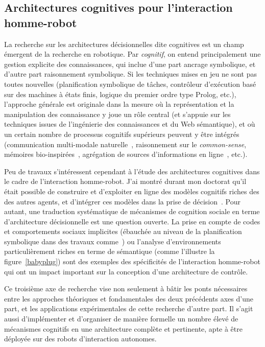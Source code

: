\documentclass[a4paper]{article}
\begin{document}
\subsection{Architectures cognitives pour l'interaction homme-robot}

La recherche sur les architectures décisionnelles dite cognitives est un champ
émergent de la recherche en robotique. Par \emph{cognitif}, on entend
principalement une gestion explicite des connaissances, qui inclue d'une part
ancrage symbolique, et d'autre part raisonnement symbolique. Si les techniques
mises en jeu ne sont pas toutes nouvelles (planification symbolique de tâches,
contrôleur d'exécution basé sur des machines à états finis, logique du premier
ordre type Prolog, etc.), l'approche générale est originale dans la mesure où la
représentation et la manipulation des connaissance y joue un rôle central (et
s'appuie sur les techniques issues de l'ingénierie des connaissances et du Web
sémantique), et où un certain nombre de processus cognitifs supérieurs peuvent y
être intégrés (communication multi-modale naturelle~\cite{Chen2010,
Lemaignan2011a}, raisonnement sur le \emph{common-sense}, mémoires
bio-inspirées~\cite{trafton2013act}, agrégation de sources d'informations en
ligne~\cite{Beetz2010}, etc.).

Peu de travaux s'intéressent cependant à l'étude des architectures cognitives
dans le cadre de l'interaction homme-robot. J'ai montré durant mon doctorat
qu'il était possible de construire et d'exploiter en ligne des modèles cognitifs
riches des des autres agents, et d'intégrer ces modèles dans la prise de
décision~\cite{alami2011when, warnier2012when, lemaignan2014human}. Pour autant,
une traduction systématique de mécanismes de cognition sociale en terme
d'architecture décisionnelle est une question ouverte. La prise
en compte de codes et comportements sociaux implicites (ébauchée au niveau de la
planification symbolique dans des travaux comme~\cite{Alili2009}) ou l'analyse
d'environnements particulièrement riches en terme de sémantique (comme
l'illustre la figure~\ref{babyplug}) sont des exemples des spécificités de
l'interaction homme-robot qui ont un impact important sur la conception d'une
architecture de contrôle.

Ce troisième axe de recherche vise non seulement à bâtir les ponts nécessaires
entre les approches théoriques et fondamentales des deux précédents axes d'une
part, et les applications expérimentales de cette recherche d'autre part. Il
s'agit aussi d'implémenter et d'organiser de manière formelle un nombre élevé de
mécanismes cognitifs en une architecture complète et pertinente, apte à être
déployée sur des robots d'interaction autonomes.
\end{document}
